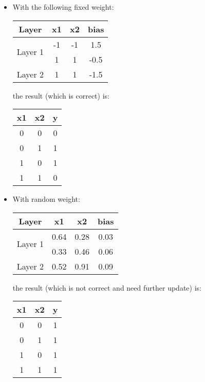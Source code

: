 \documentclass{article}
\begin{document}
\begin{itemize}
    \item With the following fixed weight:
        \begin{center}
            \begin{tabular}{ |c|c|c|c| } 
                \hline
                Layer & x1 & x2 & bias \\
                \hline
                \multirow{2}{4em}{Layer 1} & -1 & -1 & 1.5 \\ 
                & 1 & 1 & -0.5 \\ 
                \hline
                \hline
                \multirow{1}{4em}{Layer 2} & 1 & 1 & -1.5 \\ 
                \hline
            \end{tabular}
        \end{center}
    the result (which is correct) is:
        \begin{center}
            \begin{tabular}{ |c|c|c| } 
                \hline
                x1 & x2 & y \\
                \hline
                0 & 0 & 0 \\ 
                0 & 1 & 1 \\ 
                1 & 0 & 1 \\ 
                1 & 1 & 0 \\ 
                \hline
            \end{tabular}
        \end{center}
    
    \item With random weight:
        \begin{center}
            \begin{tabular}{ |c|c|c|c| } 
                \hline
                Layer & x1 & x2 & bias \\
                \hline
                \multirow{2}{4em}{Layer 1} & 0.64 & 0.28 & 0.03 \\ 
                & 0.33 & 0.46 & 0.06 \\ 
                \hline
                \hline
                \multirow{1}{4em}{Layer 2} & 0.52 & 0.91 & 0.09 \\ 
                \hline
            \end{tabular}
        \end{center}
    the result (which is not correct and need further update) is:
        \begin{center}
            \begin{tabular}{ |c|c|c| } 
                \hline
                x1 & x2 & y \\
                \hline
                0 & 0 & 1 \\ 
                0 & 1 & 1 \\ 
                1 & 0 & 1 \\ 
                1 & 1 & 1 \\ 
                \hline
            \end{tabular}
        \end{center}
\end{itemize}
\end{document}
